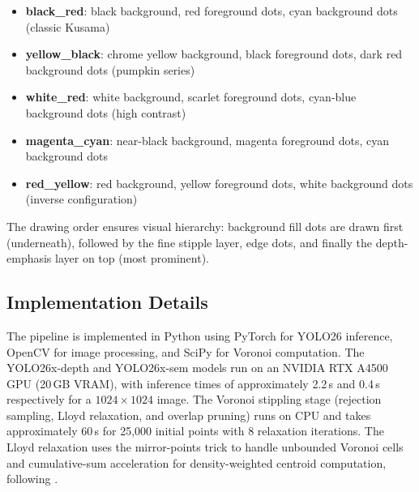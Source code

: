 \begin{itemize}
    \item \textbf{black\_red}: black background, red foreground dots,
    cyan background dots (classic Kusama)
    \item \textbf{yellow\_black}: chrome yellow background, black
    foreground dots, dark red background dots (pumpkin series)
    \item \textbf{white\_red}: white background, scarlet foreground
    dots, cyan-blue background dots (high contrast)
    \item \textbf{magenta\_cyan}: near-black background, magenta
    foreground dots, cyan background dots
    \item \textbf{red\_yellow}: red background, yellow foreground dots,
    white background dots (inverse configuration)
\end{itemize}

The drawing order ensures visual hierarchy: background fill dots are
drawn first (underneath), followed by the fine stipple layer, edge
dots, and finally the depth-emphasis layer on top (most prominent).

\subsection{Implementation Details}

The pipeline is implemented in Python using PyTorch for YOLO26
inference, OpenCV for image processing, and SciPy for Voronoi
computation. The YOLO26x-depth and YOLO26x-sem models run on an NVIDIA
RTX A4500 GPU (20\,GB VRAM), with inference times of approximately
2.2\,s and 0.4\,s respectively for a $1024 \times 1024$ image. The
Voronoi stippling stage (rejection sampling, Lloyd relaxation, and
overlap pruning) runs on CPU and takes approximately 60\,s for 25,000
initial points with 8 relaxation iterations. The Lloyd relaxation uses
the mirror-points trick to handle unbounded Voronoi cells and
cumulative-sum acceleration for density-weighted centroid computation,
following \citet{secord2002weighted}.
